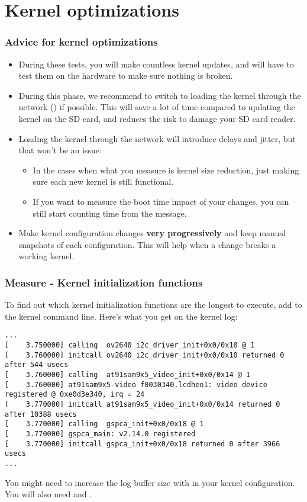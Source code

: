 \section{Kernel optimizations}

\begin{frame}
\frametitle{Advice for kernel optimizations}
	\small
	\begin{itemize}
	\item During these tests, you will make countless kernel updates, and will
	      have to test them on the hardware to make sure nothing is broken.
	\item During this phase, we recommend to switch to loading the kernel through
	      the network () if possible. This will save a lot of time
	      compared to updating the kernel on the SD card, and reduces the risk
	      to damage your SD card reader.
	\item Loading the kernel through the network will introduce delays and jitter,
	      but that won't be an issue:
	      \begin{itemize}
	      \item In the cases when what you measure is kernel size reduction, just
		    making sure each new kernel is still functional.
	      \item If you want to measure the boot time impact of your changes,
		    you can still start counting time from the 
		    message.
	      \end{itemize}
	\item Make kernel configuration changes {\bf very progressively} and keep
	      manual snapshots of each configuration. This will help when a change
	      breaks a working kernel.
	\end{itemize}
\end{frame}

\begin{frame}[fragile]
\frametitle{Measure - Kernel initialization functions}
To find out which kernel initialization functions are the longest to
execute, add  to the kernel command line.
Here's what you get on the kernel log:
\begin{block}{}
\tiny
\begin{verbatim}
...
[    3.750000] calling  ov2640_i2c_driver_init+0x0/0x10 @ 1
[    3.760000] initcall ov2640_i2c_driver_init+0x0/0x10 returned 0 after 544 usecs
[    3.760000] calling  at91sam9x5_video_init+0x0/0x14 @ 1
[    3.760000] at91sam9x5-video f0030340.lcdheo1: video device registered @ 0xe0d3e340, irq = 24
[    3.770000] initcall at91sam9x5_video_init+0x0/0x14 returned 0 after 10388 usecs
[    3.770000] calling  gspca_init+0x0/0x18 @ 1
[    3.770000] gspca_main: v2.14.0 registered
[    3.770000] initcall gspca_init+0x0/0x18 returned 0 after 3966 usecs
...
\end{verbatim}
\end{block}
You might need to increase the log buffer size with
 in your kernel configuration. You will
also need  and .
\end{frame}

